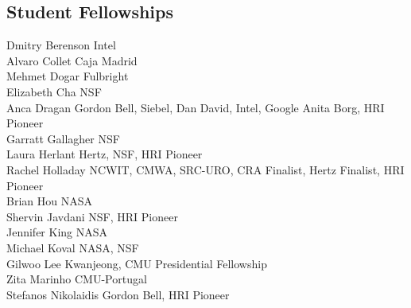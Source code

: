 \subsection{Student Fellowships}
\noindent
Dmitry Berenson \hfill Intel\\
Alvaro Collet \hfill Caja Madrid\\
Mehmet Dogar \hfill Fulbright\\
Elizabeth Cha \hfill NSF\\
Anca Dragan \hfill Gordon Bell, Siebel, Dan David, Intel, Google Anita Borg, HRI Pioneer\\
Garratt Gallagher \hfill NSF\\
Laura Herlant \hfill Hertz, NSF, HRI Pioneer\\
Rachel Holladay \hfill NCWIT, CMWA, SRC-URO, CRA Finalist, Hertz Finalist, HRI Pioneer\\
Brian Hou \hfill NASA\\
Shervin Javdani \hfill NSF, HRI Pioneer\\
Jennifer King \hfill NASA\\
Michael Koval \hfill NASA, NSF\\
Gilwoo Lee \hfill Kwanjeong, CMU Presidential Fellowship \\
Zita Marinho \hfill CMU-Portugal\\
Stefanos Nikolaidis \hfill Gordon Bell, HRI Pioneer\\


